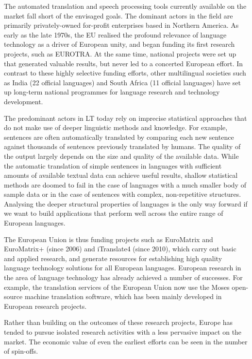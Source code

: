\begin{multicols}{2}
  The automated translation and speech processing tools currently available on the market fall short of the envisaged goals. The dominant actors in the field are primarily privately-owned for-profit enterprises based in Northern America. As early as the late 1970s, the EU realised the profound relevance of language technology as a driver of European unity, and began funding its first research projects, such as EUROTRA. At the same time, national projects were set up that generated valuable results, but never led to a concerted European effort. In contrast to these highly selective funding efforts, other multilingual societies such as India (22 official languages) and South Africa (11 official languages) have set up long-term national programmes for language research and technology development. 

  The predominant actors in LT today rely on imprecise statistical approaches that do not make use of deeper linguistic methods and knowledge. For example, sentences are often automatically translated by comparing each new sentence against thousands of sentences previously translated by humans. The quality of the output largely depends on the size and quality of the available  data. While the automatic translation of simple sentences in languages with sufficient amounts of available textual data can achieve useful results, shallow statistical methods are doomed to fail in the case of languages with a much smaller body of sample data or in the case of sentences with complex, non-repetitive structures. Analysing the deeper structural properties of languages is the only way forward if we want to build applications that perform well across the entire range of European languages.


  The European Union is thus funding projects such as EuroMatrix and EuroMatrix+ (since 2006) and iTranslate4 (since 2010), which carry out basic and applied research, and generate resources for establishing high quality language technology solutions for all European languages. 
  European research in the area of language technology has already achieved a number of successes. For example, the translation services of the European Union now use the Moses open-source machine translation software, which has been mainly developed in European research projects. 

  Rather than building on the outcomes of these research projects, Europe has tended to pursue isolated research activities with a less pervasive impact on the market. The economic value of even the earliest efforts can be seen in the number of spin-offs. 


\end{multicols}
